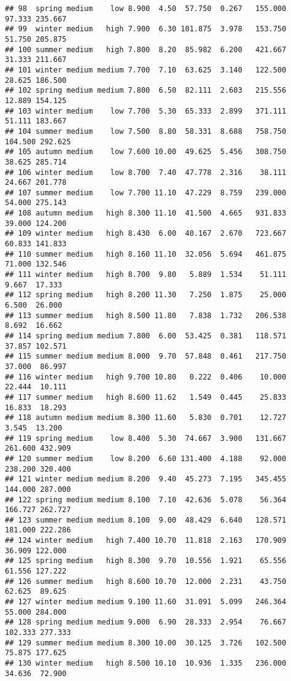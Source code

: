 \documentclass[
]{article}
\begin{document}
\begin{verbatim}
## 98  spring medium    low 8.900  4.50  57.750  0.267   155.000  97.333 235.667
## 99  winter medium   high 7.900  6.30 101.875  3.978   153.750  51.750 205.875
## 100 summer medium   high 7.800  8.20  85.982  6.200   421.667  31.333 211.667
## 101 winter medium medium 7.700  7.10  63.625  3.140   122.500  28.625 186.500
## 102 spring medium medium 7.800  6.50  82.111  2.603   215.556  12.889 154.125
## 103 winter medium    low 7.700  5.30  65.333  2.899   371.111  51.111 183.667
## 104 summer medium    low 7.500  8.80  58.331  8.688   758.750 104.500 292.625
## 105 autumn medium    low 7.600 10.00  49.625  5.456   308.750  38.625 285.714
## 106 winter medium    low 8.700  7.40  47.778  2.316    38.111  24.667 201.778
## 107 summer medium    low 7.700 11.10  47.229  8.759   239.000  54.000 275.143
## 108 autumn medium   high 8.300 11.10  41.500  4.665   931.833  39.000 124.200
## 109 winter medium   high 8.430  6.00  40.167  2.670   723.667  60.833 141.833
## 110 summer medium   high 8.160 11.10  32.056  5.694   461.875  71.000 132.546
## 111 winter medium   high 8.700  9.80   5.889  1.534    51.111   9.667  17.333
## 112 spring medium   high 8.200 11.30   7.250  1.875    25.000   6.500  26.000
## 113 summer medium   high 8.500 11.80   7.838  1.732   206.538   8.692  16.662
## 114 spring medium medium 7.800  6.00  53.425  0.381   118.571  37.857 102.571
## 115 summer medium medium 8.000  9.70  57.848  0.461   217.750  37.000  86.997
## 116 winter medium   high 9.700 10.80   0.222  0.406    10.000  22.444  10.111
## 117 summer medium   high 8.600 11.62   1.549  0.445    25.833  16.833  18.293
## 118 autumn medium medium 8.300 11.60   5.830  0.701    12.727   3.545  13.200
## 119 spring medium    low 8.400  5.30  74.667  3.900   131.667 261.600 432.909
## 120 summer medium    low 8.200  6.60 131.400  4.188    92.000 238.200 320.400
## 121 winter medium medium 8.200  9.40  45.273  7.195   345.455 144.000 287.000
## 122 spring medium medium 8.100  7.10  42.636  5.078    56.364 166.727 262.727
## 123 summer medium medium 8.100  9.00  48.429  6.640   128.571 181.000 222.286
## 124 winter medium   high 7.400 10.70  11.818  2.163   170.909  36.909 122.000
## 125 spring medium   high 8.300  9.70  10.556  1.921    65.556  61.556 127.222
## 126 summer medium   high 8.600 10.70  12.000  2.231    43.750  62.625  89.625
## 127 winter medium medium 9.100 11.60  31.091  5.099   246.364  55.000 284.000
## 128 spring medium medium 9.000  6.90  28.333  2.954    76.667 102.333 277.333
## 129 summer medium medium 8.300 10.00  30.125  3.726   102.500  75.875 177.625
## 130 winter medium   high 8.500 10.10  10.936  1.335   236.000  34.636  72.900

\end{verbatim}
\end{document}
